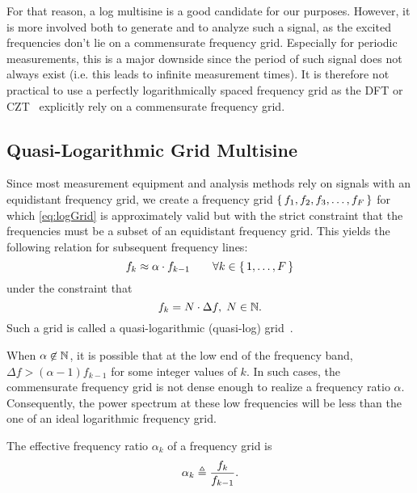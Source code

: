   For that reason, a log multisine is a good candidate for our purposes.
  However, it is more involved both to generate and to analyze such a signal, as the excited frequencies don't lie on a commensurate frequency grid.
  Especially for periodic measurements, this is a major downside since the period of such signal does not always exist (i.e. this leads to infinite measurement times).
  It is therefore not practical to use a perfectly logarithmically spaced frequency grid as the \gls{DFT} or \gls{CZT}~\citep{Rabiner2004} explicitly rely on a commensurate frequency grid.
  
\subsection{Quasi-Logarithmic Grid Multisine}
  Since most measurement equipment and analysis methods rely on signals with an equidistant frequency grid, we create a frequency grid
  $\set{f_1, f_2, f_3,\ldots, f_F}$ for which \eqref{eq:logGrid} is approximately  valid but with the strict constraint that the frequencies must be a subset  of an equidistant frequency grid. 
  This yields the following relation for  subsequent frequency lines:
  \begin{equation}
    f_k \approx \alpha \cdot f_{k-1}
    \qquad \forall k \in \set{1,\ldots,F}
  \label{eq:qlogGrid}
  \end{equation}
  under the constraint that
  \begin{equation}
    f_k = N \cdot \Delta f,\; N \in \mathbb{N}
    \text{.}
    \label{eq:constraintLinGrid}
  \end{equation}
  Such a grid is called a quasi-logarithmic (quasi-log) grid~\citep{Pintelon2012}. 

  \begin{remark}
  When $\alpha \not\in \mathbb{N}$, it is possible that at the low end of the frequency band, $\Delta f > \left(\alpha -1 \right) f_{k-1}$ for some integer values of $k$.
  In such cases, the commensurate frequency grid is not dense enough to realize a frequency ratio $\alpha$.
  Consequently, the power spectrum at these low frequencies will be less than the one of an ideal logarithmic frequency grid.
  \end{remark}

  \begin{definition}
  The effective frequency ratio $\alpha_k$ of a frequency grid is
  \begin{equation}
    \alpha_k \triangleq  \frac{f_k}{f_{k-1}}
    \text{.}
  \end{equation}
  \end{definition}

